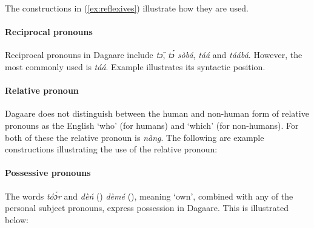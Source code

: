     

 
 
 

The constructions in (\ref{ex:reflexives}) illustrate how they are used.


\ea \label{ex:reflexives} 
 \z \z



\paragraph{Reciprocal pronouns}
Reciprocal pronouns in Dagaare include \textit{tɔ̌}, \textit{tɔ́ sòbá}, \textit{táá} and \textit{táábá}. However, the
most commonly used is \textit{táá}. Example  illustrates its syntactic position.

\z 

\paragraph{Relative pronoun}
Dagaare does not distinguish between the human and non-human form of relative
pronouns as the English ‘who’ (for humans) and ‘which’ (for non-humans). For both of these
the relative pronoun is \textit{nàng}. The following are example constructions illustrating the use of
the relative pronoun:

\ea {}
\z\z

\paragraph{Possessive pronouns}
The words \textit{tóɔ́r} and \textit{dèń} ({\SG}) \textit{dèmé} ({\PL}), meaning ‘own’, combined with any of the
personal subject pronouns, express possession in Dagaare. This is illustrated below:

